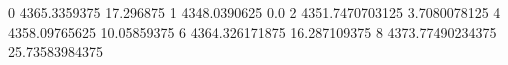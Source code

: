 0 4365.3359375 17.296875
1 4348.0390625 0.0
2 4351.7470703125 3.7080078125
4 4358.09765625 10.05859375
6 4364.326171875 16.287109375
8 4373.77490234375 25.73583984375

